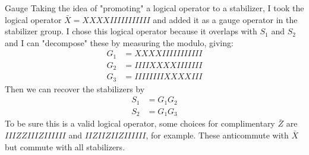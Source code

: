 \documentclass{beamer}
\begin{document}
\begin{frame}{Gauge}
    Taking the idea of "promoting" a logical operator to a stabilizer, I took the logical operator $\bar X = XXXXIIIIIIIIIII$ and added it as a gauge operator in the stabilizer group. I chose this logical operator because it overlaps with $S_1$ and $S_2$ and I can "decompose" these by measuring the modulo, giving:
    \begin{align*}
        G_1 &= XXXXIIIIIIIIIII \\
        G_2 &= IIIIXXXXIIIIIII \\
        G_3 &= IIIIIIIIXXXXIII
    \end{align*}
    Then we can recover the stabilizers by
    \begin{align*}
        S_1 &= G_1G_2 \\
        S_2 &= G_1G_3
    \end{align*}
    To be sure this is a valid logical operator, some choices for complimentary $\bar Z$ are $IIIZZIIIZIIIIII$ and $IIZIIZIIZIIIIII$, for example. These anticommute with $\bar X$ but commute with all stabilizers.
\end{frame}
\end{document}
